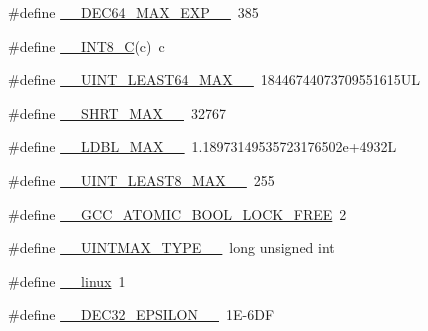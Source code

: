 \begin{DoxyCompactItemize}
\item 
\#define \hyperlink{build-analizer__host-_desktop___qt__5__9__0___g_c_c__64bit-_release_2moc__predefs_8h_a3d4fe0f0b2e3ae12569d4a663dee8a0c}{\+\_\+\+\_\+\+D\+E\+C64\+\_\+\+M\+A\+X\+\_\+\+E\+X\+P\+\_\+\+\_\+}~385
\item 
\#define \hyperlink{build-analizer__host-_desktop___qt__5__9__0___g_c_c__64bit-_release_2moc__predefs_8h_ad36bc14a0433c9f88496bed4ccbd65a3}{\+\_\+\+\_\+\+I\+N\+T8\+\_\+\+C}(c)~c
\item 
\#define \hyperlink{build-analizer__host-_desktop___qt__5__9__0___g_c_c__64bit-_release_2moc__predefs_8h_a4bf843ffcadf9b162b74c1b7e546e8e9}{\+\_\+\+\_\+\+U\+I\+N\+T\+\_\+\+L\+E\+A\+S\+T64\+\_\+\+M\+A\+X\+\_\+\+\_\+}~18446744073709551615\+U\+L
\item 
\#define \hyperlink{build-analizer__host-_desktop___qt__5__9__0___g_c_c__64bit-_release_2moc__predefs_8h_a4f69990d03f9fb0c390a6fbad28a737b}{\+\_\+\+\_\+\+S\+H\+R\+T\+\_\+\+M\+A\+X\+\_\+\+\_\+}~32767
\item 
\#define \hyperlink{build-analizer__host-_desktop___qt__5__9__0___g_c_c__64bit-_release_2moc__predefs_8h_a06fd91f0507a4f364e469c8055f4265a}{\+\_\+\+\_\+\+L\+D\+B\+L\+\_\+\+M\+A\+X\+\_\+\+\_\+}~1.\+18973149535723176502e+4932\+L
\item 
\#define \hyperlink{build-analizer__host-_desktop___qt__5__9__0___g_c_c__64bit-_release_2moc__predefs_8h_aaf06a1464d33431377a2ee5293ec70d2}{\+\_\+\+\_\+\+U\+I\+N\+T\+\_\+\+L\+E\+A\+S\+T8\+\_\+\+M\+A\+X\+\_\+\+\_\+}~255
\item 
\#define \hyperlink{build-analizer__host-_desktop___qt__5__9__0___g_c_c__64bit-_release_2moc__predefs_8h_a9685ff8e617f3c5892c2a6fe3484f3b7}{\+\_\+\+\_\+\+G\+C\+C\+\_\+\+A\+T\+O\+M\+I\+C\+\_\+\+B\+O\+O\+L\+\_\+\+L\+O\+C\+K\+\_\+\+F\+R\+E\+E}~2
\item 
\#define \hyperlink{build-analizer__host-_desktop___qt__5__9__0___g_c_c__64bit-_release_2moc__predefs_8h_ab86380373ae9fa385c8a2464023774a8}{\+\_\+\+\_\+\+U\+I\+N\+T\+M\+A\+X\+\_\+\+T\+Y\+P\+E\+\_\+\+\_\+}~long unsigned int
\item 
\#define \hyperlink{build-analizer__host-_desktop___qt__5__9__0___g_c_c__64bit-_release_2moc__predefs_8h_a6c6342c53a7213211680dc5caae14491}{\+\_\+\+\_\+linux}~1
\item 
\#define \hyperlink{build-analizer__host-_desktop___qt__5__9__0___g_c_c__64bit-_release_2moc__predefs_8h_a13526b223391d4982c4c172c29bfdc1e}{\+\_\+\+\_\+\+D\+E\+C32\+\_\+\+E\+P\+S\+I\+L\+O\+N\+\_\+\+\_\+}~1\+E-\/6\+D\+F
\item 

\end{DoxyCompactItemize}
